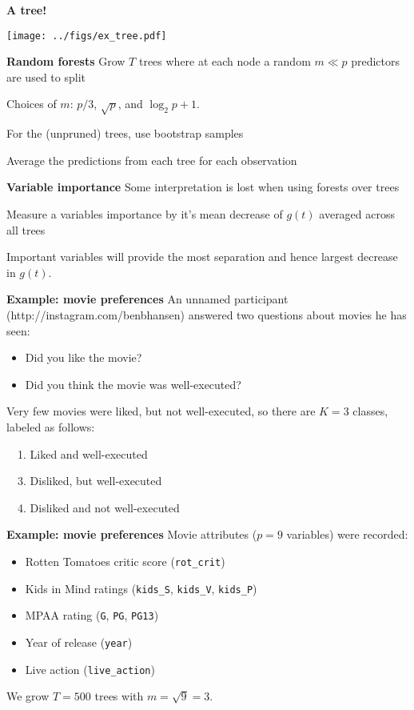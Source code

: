 \documentclass[mathserif, 11pt, t]{beamer}
\renewcommand{\subtitle}[1]{\vspace{0.45cm}\textcolor{bluegreen}{
    {\textbf{#1}}}\vspace{0.15cm}\newline}
\begin{document}
\begin{frame}
\subtitle{A tree!}
\begin{center}
\texttt{[image: ../figs/ex\_tree.pdf]}
\end{center}
\end{frame}

\begin{frame}
\subtitle{Random forests}
Grow $T$ trees where at each node a random $m\ll p$ predictors are used to split
\bigskip

Choices of $m$: $p/3$, $\sqrt{p}$, and $\log_2p + 1$.
\bigskip

For the (unpruned) trees, use bootstrap samples
\bigskip

Average the predictions from each tree for each observation
\end{frame}

\begin{frame}
\subtitle{Variable importance}
Some interpretation is lost when using forests over trees
\bigskip

Measure a variables importance by it's mean decrease of $g(t)$ averaged across all trees
\bigskip

Important variables will provide the most separation and hence largest decrease in $g(t)$.
\end{frame}

\begin{frame}
\subtitle{Example: movie preferences}
An unnamed participant (http://instagram.com/benbhansen) answered two questions about movies he has seen:
\begin{itemize}[label={$\cdot$}]
\item Did you like the movie?
\item Did you think the movie was well-executed?
\end{itemize}
\bigskip

Very few movies were liked, but not well-executed, so there are $K=3$ classes, labeled as follows:
\smallskip

~~1. Liked and well-executed
\smallskip

~~3. Disliked, but well-executed
\smallskip

~~4. Disliked and not well-executed
\end{frame}

\begin{frame}
\subtitle{Example: movie preferences}
Movie attributes ($p=9$ variables) were recorded:
\begin{itemize}[label={$\cdot$}]
\item Rotten Tomatoes critic score (\texttt{rot\_crit})
\item Kids in Mind ratings (\texttt{kids\_S}, \texttt{kids\_V}, \texttt{kids\_P})
\item MPAA rating (\texttt{G}, \texttt{PG}, \texttt{PG13})
\item Year of release (\texttt{year})
\item Live action (\texttt{live\_action})
\end{itemize}
\bigskip

We grow $T=500$ trees with $m=\sqrt{9}=3$.
\end{frame}
\end{document}
